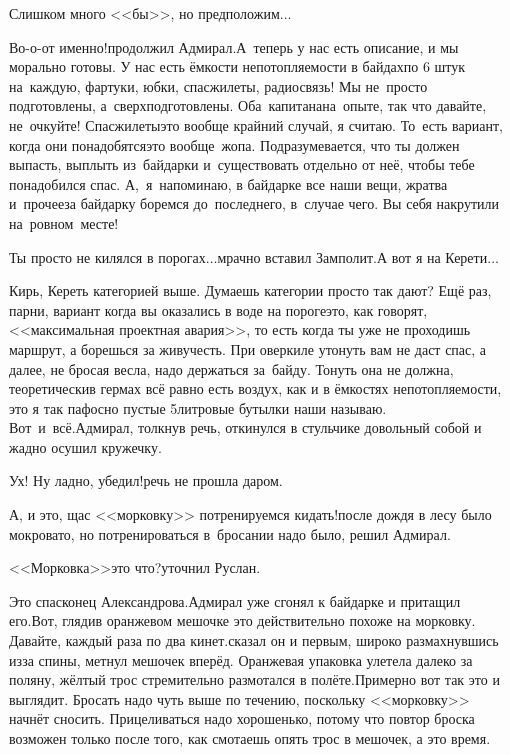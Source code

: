 \diagdash Слишком много <<бы>>, но предположим$\ldots$

\diagdash Во-о-от именно!\mdash продолжил Адмирал.\mdash А~теперь у нас есть описание, и мы морально готовы. У нас есть ёмкости непотопляемости в байдах\mdash по 6 штук на~каждую, фартуки, юбки, спасжилеты, радиосвязь! Мы не~просто подготовлены, а~сверхподготовлены. Оба~капитана\mdash на~опыте, так что давайте, не~очкуйте! Спасжилеты\mdash это вообще крайний случай, я считаю. То~есть вариант, когда они понадобятся\mdash это вообще~жопа. Подразумевается, что ты должен выпасть, выплыть из~байдарки и~существовать отдельно от неё, чтобы тебе понадобился спас. А,~я~напоминаю, в байдарке все наши вещи, жратва и~прочее\mdash за байдарку боремся до~последнего, в~случае чего. Вы себя накрутили на~ровном~месте!

\diagdash Ты просто не килялся в порогах$\ldots$\mdash мрачно вставил Замполит.\mdash А вот я на Керети$\ldots$

\diagdash Кирь, Кереть категорией выше. Думаешь категории просто так дают? Ещё раз, парни, вариант когда вы оказались в воде на пороге\mdash это, как говорят, <<максимальная проектная авария>>, то есть когда ты уже не проходишь маршрут, а борешься за живучесть. При оверкиле утонуть вам не даст спас, а далее, не бросая весла, надо держаться за~байду. Тонуть она не должна, теоретически\mdash в гермах всё равно есть воздух, как и в ёмкостях непотопляемости, это я так пафосно пустые 5\sdash литровые бутылки наши называю. Вот~и~всё.\mdash Адмирал, толкнув речь, откинулся в стульчике довольный собой и жадно осушил кружечку.

\diagdash Ух! Ну ладно, убедил!\mdash речь не прошла даром.

\diagdash А, и это, щас <<морковку>> потренируемся кидать!\mdash после дождя в лесу было мокровато, но потренироваться в~бросании надо было, решил Адмирал.

\diagdash <<Морковка>>\mdash это что?\mdash уточнил Руслан.

\diagdash Это спасконец Александрова.\mdash Адмирал уже сгонял к байдарке и притащил его.\mdash Вот, гляди\mdash в оранжевом мешочке это действительно похоже на морковку. Давайте, каждый раза по два кинет.\mdash сказал он и первым, широко размахнувшись из\sdash за спины, метнул мешочек вперёд. Оранжевая упаковка улетела далеко за поляну, жёлтый трос стремительно размотался в полёте.\mdash Примерно вот так это и выглядит. Бросать надо чуть выше по течению, поскольку <<морковку>> начнёт сносить. Прицеливаться надо хорошенько, потому что повтор броска возможен только после того, как смотаешь опять трос в мешочек, а это время.

